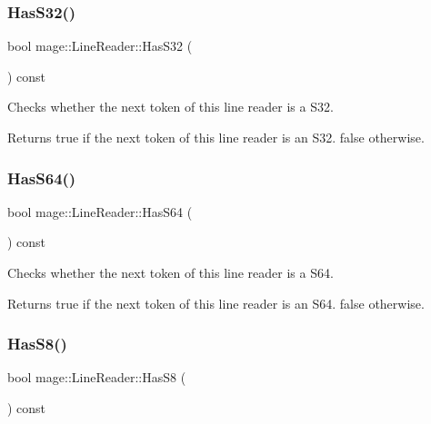 \subsubsection{\texorpdfstring{Has\+S32()}{HasS32()}}
{\footnotesize\ttfamily bool mage\+::\+Line\+Reader\+::\+Has\+S32 (\begin{DoxyParamCaption}{ }\end{DoxyParamCaption}) const\hspace{0.3cm}{\ttfamily [protected]}}

Checks whether the next token of this line reader is a {\ttfamily S32}.

\begin{DoxyReturn}{Returns}
{\ttfamily true} if the next token of this line reader is an {\ttfamily S32}. {\ttfamily false} otherwise. 
\end{DoxyReturn}
\hypertarget{classmage_1_1_line_reader_a132804ad3f6a004da5ece8a00cda16f5}{}\label{classmage_1_1_line_reader_a132804ad3f6a004da5ece8a00cda16f5} 
\subsubsection{\texorpdfstring{Has\+S64()}{HasS64()}}
{\footnotesize\ttfamily bool mage\+::\+Line\+Reader\+::\+Has\+S64 (\begin{DoxyParamCaption}{ }\end{DoxyParamCaption}) const\hspace{0.3cm}{\ttfamily [protected]}}

Checks whether the next token of this line reader is a {\ttfamily S64}.

\begin{DoxyReturn}{Returns}
{\ttfamily true} if the next token of this line reader is an {\ttfamily S64}. {\ttfamily false} otherwise. 
\end{DoxyReturn}
\hypertarget{classmage_1_1_line_reader_a462fbc4ef67b7f84940a51075c85e4b9}{}\label{classmage_1_1_line_reader_a462fbc4ef67b7f84940a51075c85e4b9} 
\subsubsection{\texorpdfstring{Has\+S8()}{HasS8()}}
{\footnotesize\ttfamily bool mage\+::\+Line\+Reader\+::\+Has\+S8 (\begin{DoxyParamCaption}{ }\end{DoxyParamCaption}) const\hspace{0.3cm}{\ttfamily [protected]}}

